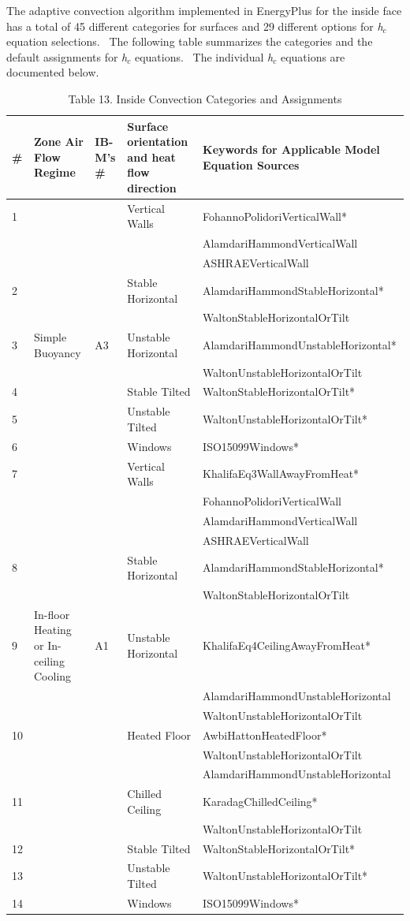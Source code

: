 The adaptive convection algorithm implemented in EnergyPlus for the inside face has a total of 45 different categories for surfaces and 29 different options for \emph{h\(_{c}\)} equation selections.~ The following table summarizes the categories and the default assignments for \emph{h\(_{c}\)} equations.~ The individual \emph{h\(_{c}\)} equations are documented below.

\begin{longtable}[c]{p{0.25in}p{1.25in}p{0.25in}p{1.5in}p{2.75in}}
\caption{Table 13. Inside Convection Categories and Assignments \label{table:table-13.-inside-convection-categories}}\\
\toprule 
\# & Zone Air Flow Regime & IB-M's \# & Surface orientation and heat flow direction & Keywords for Applicable Model Equation Sources \tabularnewline \midrule \endhead
1  & & & Vertical Walls & FohannoPolidoriVerticalWall* \tabularnewline
   & & & & AlamdariHammondVerticalWall \tabularnewline
   & & & & ASHRAEVerticalWall \tabularnewline
2  & & & Stable Horizontal & AlamdariHammondStableHorizontal* \tabularnewline
   & & & & WaltonStableHorizontalOrTilt \tabularnewline
3  & Simple Buoyancy & A3 & Unstable Horizontal & AlamdariHammondUnstableHorizontal* \tabularnewline
   & & & & WaltonUnstableHorizontalOrTilt \tabularnewline
4  & & & Stable Tilted & WaltonStableHorizontalOrTilt* \tabularnewline
5  & & & Unstable Tilted & WaltonUnstableHorizontalOrTilt* \tabularnewline
6  & & & Windows & ISO15099Windows* \tabularnewline
\midrule
7  & & & Vertical Walls & KhalifaEq3WallAwayFromHeat* \tabularnewline
   & & & & FohannoPolidoriVerticalWall \tabularnewline
   & & & & AlamdariHammondVerticalWall \tabularnewline
   & & & & ASHRAEVerticalWall \tabularnewline
8  & & & Stable Horizontal & AlamdariHammondStableHorizontal* \tabularnewline
   & & & & WaltonStableHorizontalOrTilt \tabularnewline
9  & In-floor Heating or In-ceiling Cooling & A1 & Unstable Horizontal & KhalifaEq4CeilingAwayFromHeat* \tabularnewline
   & & & & AlamdariHammondUnstableHorizontal \tabularnewline
   & & & & WaltonUnstableHorizontalOrTilt \tabularnewline
10 & & & Heated Floor & AwbiHattonHeatedFloor* \tabularnewline
 & & & & WaltonUnstableHorizontalOrTilt \tabularnewline
 & & & & AlamdariHammondUnstableHorizontal \tabularnewline
11 & & & Chilled Ceiling & KaradagChilledCeiling* \tabularnewline
 & & & & WaltonUnstableHorizontalOrTilt \tabularnewline
12 & & & Stable Tilted & WaltonStableHorizontalOrTilt* \tabularnewline
13 & & & Unstable Tilted & WaltonUnstableHorizontalOrTilt* \tabularnewline
14 & & & Windows & ISO15099Windows* \tabularnewline

\end{longtable}
